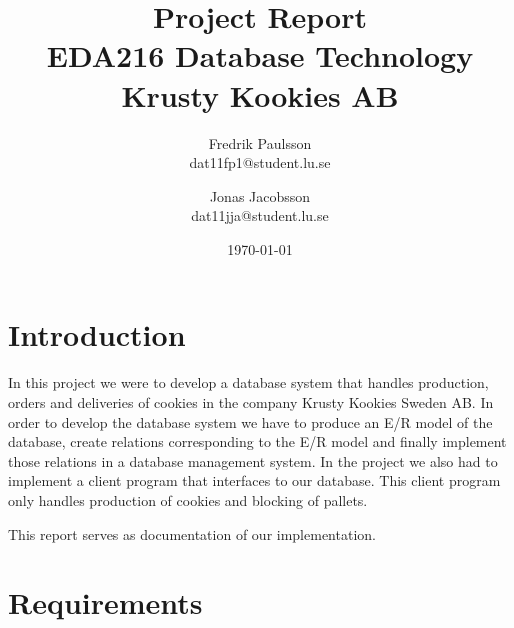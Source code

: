 \documentclass[a4paper]{article}
\title{Project Report \\ EDA216 Database Technology \\ Krusty Kookies AB}
\date{\today}
\author{Fredrik Paulsson \\ dat11fp1@student.lu.se \and Jonas Jacobsson \\ dat11jja@student.lu.se}
\begin{document}
\maketitle
\newpage


\section{Introduction}
In this project we were to develop a database system that handles production, orders and deliveries of cookies in the company Krusty Kookies Sweden AB. In order to develop the database system we have to produce an E/R model of the database, create relations corresponding to the E/R model and finally implement those relations in a database management system. In the project we also had to implement a client program that interfaces to our database. This client program only handles production of cookies and blocking of pallets.

This report serves as documentation of our implementation. 

\section{Requirements}
\end{document}
